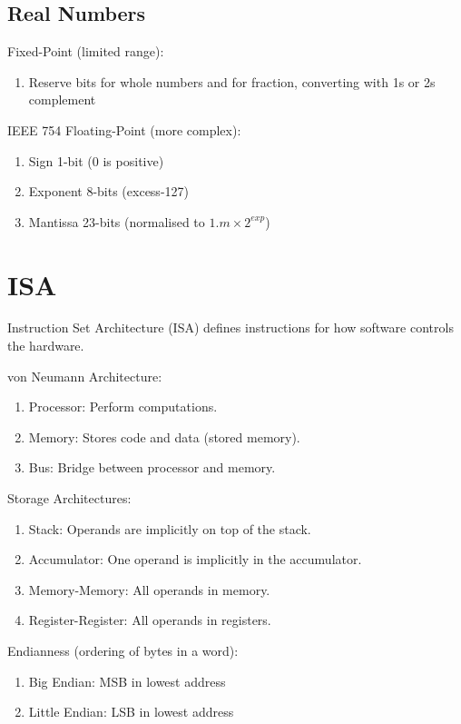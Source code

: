 \documentclass[12pt, a4paper]{article}
\begin{document}
\begin{multicols*}{3}
\subsection{Real Numbers}

Fixed-Point (limited range):
\begin{enumerate}[\roman*.]
  \item Reserve bits for whole numbers and for fraction, converting with 1s or 2s complement
\end{enumerate}

IEEE 754 Floating-Point (more complex):
\begin{enumerate}[\roman*.]
  \item Sign 1-bit (0 is positive)
  \item Exponent 8-bits (excess-127)
  \item Mantissa 23-bits (normalised to $1.m \times 2^{exp}$)
\end{enumerate}
\colbreak

\section{ISA}

Instruction Set Architecture (ISA) defines instructions for how software controls the hardware. 

von Neumann Architecture:
\begin{enumerate}[\roman*.]
  \item Processor: Perform computations.
  \item Memory: Stores code and data (stored memory).
  \item Bus: Bridge between processor and memory.
\end{enumerate}

Storage Architectures:
\begin{enumerate}[\roman*.]
  \item Stack: Operands are implicitly on top of the stack.
  \item Accumulator: One operand is implicitly in the accumulator.
  \item Memory-Memory: All operands in memory.
  \item Register-Register: All operands in registers.
\end{enumerate}

Endianness (ordering of bytes in a word):
\begin{enumerate}[\roman*.]
  \item Big Endian: MSB in lowest address
  \item Little Endian: LSB in lowest address
\end{enumerate}


\end{multicols*}
\end{document}

